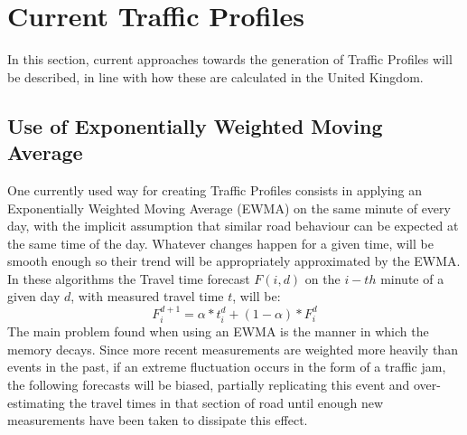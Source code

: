 \documentclass[conference, letterpaper]{IEEEtran}
\begin{document}
\section{Current Traffic Profiles}
In this section, current approaches towards the generation of Traffic Profiles will be described, in line with how these are calculated in the United Kingdom.

\subsection{Use of Exponentially Weighted Moving Average} \label{ewma}
One currently used way for creating Traffic Profiles consists in applying an Exponentially Weighted Moving Average (EWMA) on the same minute of every day, with the implicit assumption that similar road behaviour can be expected at the same time of the day. 
Whatever changes happen for a given time, will be smooth enough so their trend will be appropriately approximated by the EWMA.
In these algorithms the Travel time forecast $F(i,d)$ on the $i-th$ minute of a given day $d$, with measured travel time $t$, will be:
\begin{equation}
F^{d+1}_i = \alpha * t^{d}_{i} + (1-\alpha)*F^{d}_{i}
\end{equation}
The main problem found when using an EWMA is the manner in which the memory decays. 
Since more recent measurements are weighted more heavily than events in the past, if an extreme fluctuation occurs in the form of a traffic jam, the following forecasts will be biased, partially replicating this event and over-estimating the travel times in that section of road until enough new measurements have been taken to dissipate this effect.
\end{document}
